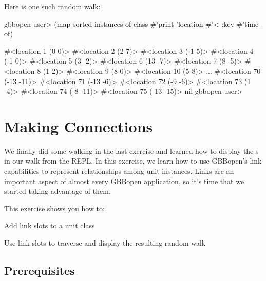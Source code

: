 \documentclass[10pt,twoside,english,pdftex]{article}
\begin{document}
%
Here is one such random walk:
%
\W\supp
\begin{example}
\textcolor{darkergray}{%
  gbbopen-user> \textcolor{black}{(map-sorted-instances-of-class #'print 'location #'< 
                   :key #'time-of)}

  #<location 1 (0 0)> 
  #<location 2 (2 7)> 
  #<location 3 (-1 5)> 
  #<location 4 (-1 0)> 
  #<location 5 (3 -2)> 
  #<location 6 (13 -7)> 
  #<location 7 (8 -5)> 
  #<location 8 (1 2)> 
  #<location 9 (8 0)> 
  #<location 10 (5 8)> 
       ...
  #<location 70 (-13 -11)> 
  #<location 71 (-13 -6)> 
  #<location 72 (-9 -6)> 
  #<location 73 (1 -4)> 
  #<location 74 (-8 -11)> 
  #<location 75 (-13 -15)> 
  nil
  gbbopen-user>}
\end{example}


\T\markright{}%
\T\pagestyle{plain}
\T\cleardoublepage
\W{}
\T\pagestyle{fancy}
\T\thispagestyle{fancybottom}
\T\renewcommand{\headrulewidth}{0pt}
\section{Making Connections}
\label{sec:connections}%


We finally did some walking in the last exercise and learned how to display
the s in our walk from the REPL.  In this exercise, we learn
how to use GBBopen's link capabilities to represent relationships among unit
instances.  Links are an important aspect of almost every GBBopen application,
so it's time that we started taking advantage of them.

\fndocrule

This exercise shows you how to:
\begin{tightitemize}
\item Add link slots to a unit class
\item Use link slots to traverse and display the resulting random walk
\end{tightitemize}

\fndocrule

\subsection*{Prerequisites}
\end{document}
